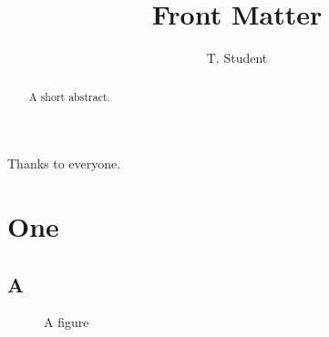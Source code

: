 \documentclass[phd,glossary,@OPTIONS@,12pt,a4paper]{bangor}
\title{Front Matter}
\author{T. Student}
\begin{document}
\maketitle
\begin{acknowledgements}
  Thanks to everyone.
\end{acknowledgements}
\begin{abstract}
  A short abstract.
\end{abstract}
\tables
\printabbrevs
\chapter{One}
\section{A}
\begin{figure}[h]\caption{A figure}\end{figure}
\begin{table}[h]\caption{A table}\end{table}
\end{document}
